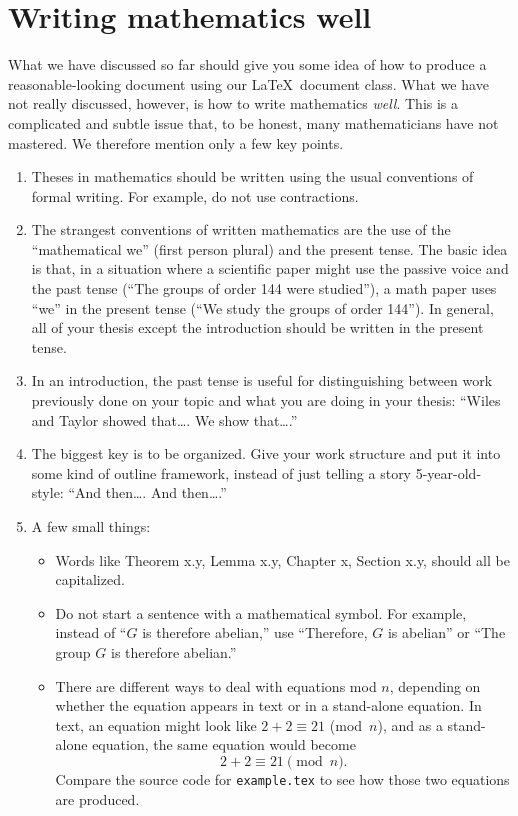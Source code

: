 \documentclass[modernstyle,12pt]{sjsuthesis}
\theoremstyle{definition}
\begin{document}
\section{Writing mathematics well}
\label{sect:well}

What we have discussed so far should give you some idea of how to
produce a reasonable-looking document using our \LaTeX\ document
class.  What we have not really discussed, however, is how to write
mathematics {\it well}.  This is a complicated and subtle issue that,
to be honest, many mathematicians have not mastered.  We therefore
mention only a few key points.

\begin{enumerate}
\item Theses in mathematics should be written using the usual
  conventions of formal writing.  For example, do not use
  contractions.
\item The strangest conventions of written mathematics are the use of
  the ``mathematical we'' (first person plural) and the present tense.
  The basic idea is that, in a situation where a scientific paper
  might use the passive voice and the past tense (``The groups of
  order 144 were studied''), a math paper uses ``we'' in the present
  tense (``We study the groups of order 144'').  In general, all of
  your thesis except the introduction should be written in the present
  tense.
\item In an introduction, the past tense is useful for distinguishing
  between work previously done on your topic and what you are doing in
  your thesis: ``Wiles and Taylor showed that\ldots.  We show
  that\ldots.''
\item The biggest key is to be organized.  Give your work structure
  and put it into some kind of outline framework, instead of just
  telling a story 5-year-old-style: ``And then\ldots.  And
  then\ldots.''
\item A few small things:
  \begin{itemize}
  \item Words like Theorem x.y, Lemma x.y, Chapter x, Section x.y,
    should all be capitalized.
  \item Do not start a sentence with a mathematical symbol.  For
    example, instead of ``$G$ is therefore abelian,'' use ``Therefore,
    $G$ is abelian'' or ``The group $G$ is therefore abelian.''
  \item There are different ways to deal with equations mod $n$,
    depending on whether the equation appears in text or in a
    stand-alone equation.  In text, an equation might look like
    $2+2\equiv 21$ (mod~$n$), and as a stand-alone equation, the same
    equation would become
    \begin{equation}
      \label{eq:modn}
      2+2\equiv 21 \pmod{n}.
    \end{equation}
    Compare the source code for {\tt example.tex\/} to see how those
    two equations are produced.
  \end{itemize}
\end{enumerate}
\end{document}
